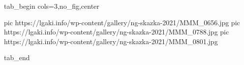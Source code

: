  
 
 
 
 


\ifcmt
  tab_begin cols=3,no_fig,center

     pic https://lgaki.info/wp-content/gallery/ng-skazka-2021/MMM_0656.jpg
		 pic https://lgaki.info/wp-content/gallery/ng-skazka-2021/MMM_0788.jpg
		 pic https://lgaki.info/wp-content/gallery/ng-skazka-2021/MMM_0801.jpg

  tab_end
\fi

